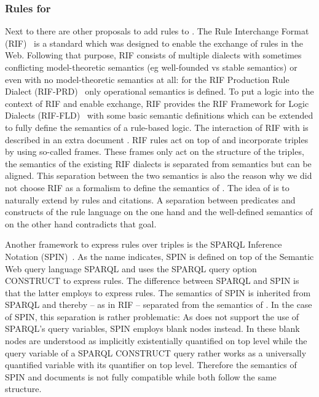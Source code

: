 \subsubsection{Rules for \rdf}
Next to \nthreelogic there are other proposals to add rules to \rdf. The Rule Interchange Format (RIF)~\cite{rif} is a \wwwc standard which was designed to enable the exchange of rules in the Web.
Following that purpose, RIF consists of multiple dialects with sometimes 
conflicting model-theoretic semantics (eg well-founded vs stable semantics) or even with no model-theoretic semantics at all: 
for the RIF Production Rule Dialect (RIF-PRD)~\cite{rifprd} only operational semantics is defined.
To put a logic into the context of RIF and enable exchange, RIF provides the RIF Framework for Logic Dialects  
(RIF-FLD)~\cite{riffld} with some basic semantic definitions which can be extended to fully define the semantics of a rule-based logic.
The interaction of RIF with \rdf is described in an extra document \cite{rifrdf}. RIF rules act on top of \rdf and incorporate triples by using so-called frames. 
These frames only act on the structure of
the triples, the semantics of 
the existing RIF dialects is separated from \rdf semantics but can be aligned. 
This separation between the two semantics is also the reason why we did not choose RIF as a formalism to define the semantics of \nthreelogic.
The idea of \nthreelogic is to naturally extend \rdf by rules and citations. A separation between predicates and constructs of the rule language on the one hand and the 
well-defined semantics of \rdf on the other hand contradicts that goal. 

Another framework to express rules over \rdf triples is the SPARQL Inference Notation (SPIN)~\cite{spin}. As the name indicates, SPIN is defined on top of the Semantic Web query language SPARQL and
uses the SPARQL query option CONSTRUCT to express rules. The difference between SPARQL and SPIN is that the latter employs \rdf to express rules. The semantics of SPIN is inherited
from SPARQL and thereby -- as in RIF -- separated from the semantics of \rdf. In the case of SPIN, this separation is rather problematic: As \rdf does not support the use of SPARQL's query variables,
SPIN employs blank nodes instead. In \rdf these blank nodes are understood as implicitly existentially quantified on top level while the query variable of a SPARQL CONSTRUCT query rather works as a
universally quantified variable with its quantifier on top level. Therefore the semantics of SPIN and \rdf documents is not fully compatible while both follow the same structure.

